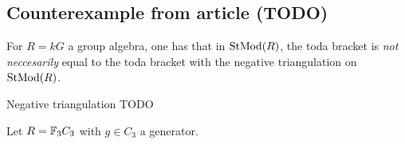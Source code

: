 \subsection{Counterexample from article (TODO)}

For \( R = kG \) a group algebra, one has that in \( \operatorname{StMod}(R) \), the toda bracket is \emph{not neccesarily} equal to the toda bracket with the negative triangulation on \( \operatorname{StMod}(R) \).

\begin{definition}
    Negative triangulation TODO
\end{definition}

Let \( R = \mathbb{F}_3C_3 \) with \( g \in C_3 \) a generator.

